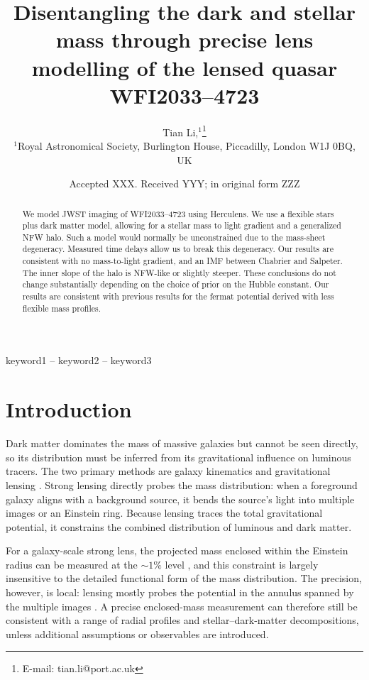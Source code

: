 \documentclass[fleqn,usenatbib]{mnras}
\title[Composite model of lensed quasar]{Disentangling the dark and stellar mass through precise lens modelling of the lensed quasar WFI2033--4723}
\author[Tian Li et al.]{
Tian Li,$^{1}$\thanks{E-mail: tian.li@port.ac.uk}
\\
$^{1}$Royal Astronomical Society, Burlington House, Piccadilly, London W1J 0BQ, UK\\
}
\date{Accepted XXX. Received YYY; in original form ZZZ}
\begin{document}
\label{firstpage}
\pagerange{\pageref{firstpage}--\pageref{lastpage}}
\maketitle

\begin{abstract}
We model JWST imaging of WFI2033--4723 using Herculens. We use a flexible stars plus dark matter model, allowing for a stellar mass to light gradient and a generalized NFW halo. Such a model would normally be unconstrained due to the mass-sheet degeneracy. Measured time delays allow us to break this degeneracy. Our results are consistent with no mass-to-light gradient, and an IMF between Chabrier and Salpeter. The inner slope of the halo is NFW-like or slightly steeper. These conclusions do not change substantially depending on the choice of prior on the Hubble constant. Our results are consistent with previous results for the fermat potential derived with less flexible mass profiles.
\end{abstract}

\begin{keywords}
keyword1 -- keyword2 -- keyword3
\end{keywords}



\section{Introduction}

Dark matter dominates the mass of massive galaxies but cannot be seen directly, so its distribution must be inferred from its gravitational influence on luminous tracers. The two primary methods are galaxy kinematics \citep{Rubin1978, Rubin1980} and gravitational lensing \citep[see][for a review]{Treu2010review}. Strong lensing directly probes the mass distribution: when a foreground galaxy aligns with a background source, it bends the source’s light into multiple images or an Einstein ring. Because lensing traces the total gravitational potential, it constrains the combined distribution of luminous and dark matter.

For a galaxy-scale strong lens, the projected mass enclosed within the Einstein radius can be measured at the $\sim 1\%$ level \citep{Schneider1992}, and this constraint is largely insensitive to the detailed functional form of the mass distribution. The precision, however, is local: lensing mostly probes the potential in the annulus spanned by the multiple images \citep{Birrer2021,O'Riordan2020}. A precise enclosed-mass measurement can therefore still be consistent with a range of radial profiles and stellar--dark-matter decompositions, unless additional assumptions or observables are introduced.
\end{document}
